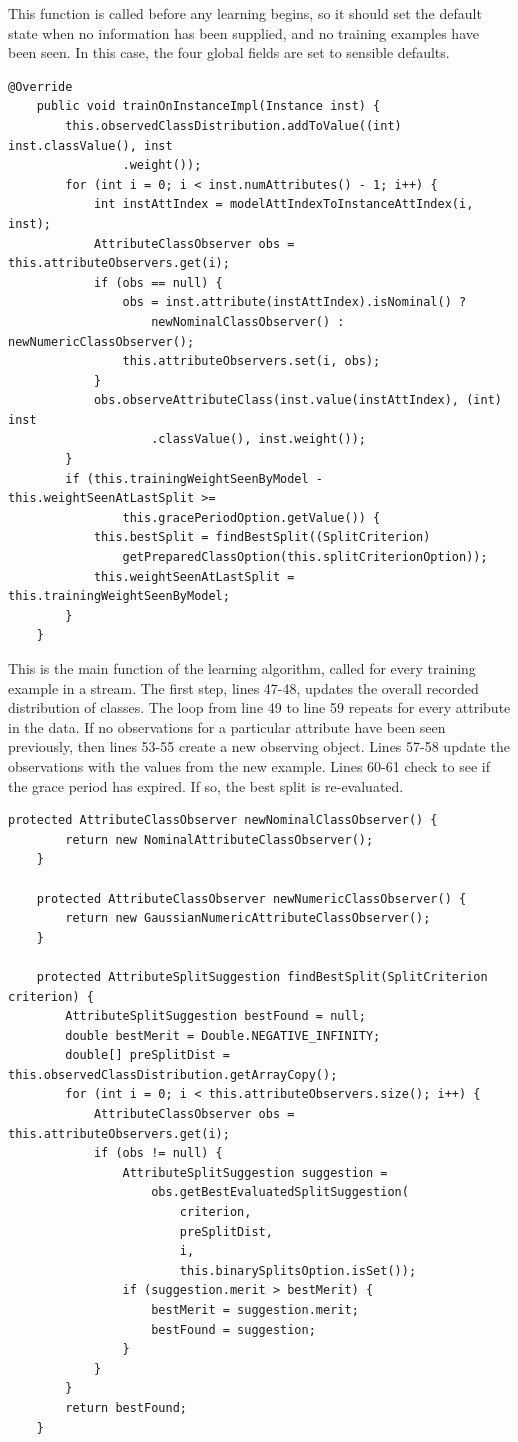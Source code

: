 \documentclass[a4paper,12pt,twoside]{book}
\begin{document}
This function is called before any learning begins, so it should set the default state when no information has been supplied, and no training examples have been seen. In this case, the four global fields are set to sensible defaults.

\begin{lstlisting}[caption={Training on examples},label=lst:train,firstnumber=45]
	@Override
	public void trainOnInstanceImpl(Instance inst) {
		this.observedClassDistribution.addToValue((int) inst.classValue(), inst
				.weight());
		for (int i = 0; i < inst.numAttributes() - 1; i++) {
			int instAttIndex = modelAttIndexToInstanceAttIndex(i, inst);
			AttributeClassObserver obs = this.attributeObservers.get(i);
			if (obs == null) {
				obs = inst.attribute(instAttIndex).isNominal() ?
					newNominalClassObserver() : newNumericClassObserver();
				this.attributeObservers.set(i, obs);
			}
			obs.observeAttributeClass(inst.value(instAttIndex), (int) inst
					.classValue(), inst.weight());
		}
		if (this.trainingWeightSeenByModel - this.weightSeenAtLastSplit >=
				this.gracePeriodOption.getValue()) {
			this.bestSplit = findBestSplit((SplitCriterion)
				getPreparedClassOption(this.splitCriterionOption));
			this.weightSeenAtLastSplit = this.trainingWeightSeenByModel;
		}
	}
\end{lstlisting}

This is the main function of the learning algorithm, called for every training example in a stream. The first step, lines 47-48, updates the overall recorded distribution of classes. The loop from line 49 to line 59 repeats for every attribute in the data. If no observations for a particular attribute have been seen previously, then lines 53-55 create a new observing object. Lines 57-58 update the observations with the values from the new example. Lines 60-61 check to see if the grace period has expired. If so, the best split is re-evaluated.

\begin{lstlisting}[caption={Functions used during training},label=lst:trainfuncs,firstnumber=79]
	protected AttributeClassObserver newNominalClassObserver() {
		return new NominalAttributeClassObserver();
	}

	protected AttributeClassObserver newNumericClassObserver() {
		return new GaussianNumericAttributeClassObserver();
	}

	protected AttributeSplitSuggestion findBestSplit(SplitCriterion criterion) {
		AttributeSplitSuggestion bestFound = null;
		double bestMerit = Double.NEGATIVE_INFINITY;
		double[] preSplitDist = this.observedClassDistribution.getArrayCopy();
		for (int i = 0; i < this.attributeObservers.size(); i++) {
			AttributeClassObserver obs = this.attributeObservers.get(i);
			if (obs != null) {
				AttributeSplitSuggestion suggestion =
					obs.getBestEvaluatedSplitSuggestion(
						criterion,
						preSplitDist,
						i,
						this.binarySplitsOption.isSet());
				if (suggestion.merit > bestMerit) {
					bestMerit = suggestion.merit;
					bestFound = suggestion;
				}
			}
		}
		return bestFound;
	}
\end{lstlisting}
\end{document}

